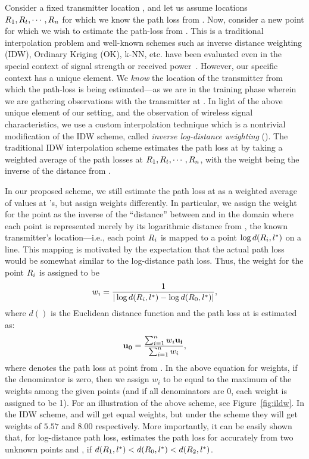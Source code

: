  Consider a fixed transmitter
location \lstar, and let us assume locations $R_1, R_t, \cdots, R_n$ for
which we know the path loss from \lstar. Now, consider a new point \lz
for which we wish to estimate the path-loss from \lstar.
This is a traditional interpolation problem and well-known schemes
such as inverse distance weighting (IDW), Ordinary Kriging (OK), k-NN,
etc. have been evaluated even in the special context of signal
strength or received power~\cite{chakraborty2017specsense}.
However, our specific context has a unique element. We
{\em know} the location \lstar of the transmitter from which the
path-loss is being estimated---as we are in the training phase wherein
we are gathering observations with the transmitter at \lstar.
In light of the above unique element of our setting, and the observation of wireless signal characteristics, we use a custom
interpolation technique which is a nontrivial modification of the IDW
scheme, called {\em inverse log-distance weighting} (\ildw). The traditional
IDW interpolation scheme estimates the
path loss at \lz by taking a weighted average of the path losses at
$R_1, R_t, \cdots, R_n$, with the weight being the inverse of the
distance from \lz. 

In our proposed \ildw scheme, we still estimate the path loss at \lz as
a weighted average of values at \li's, but assign weights differently.
In particular, we assign the weight for the point \li as the inverse
of the ``distance'' between \lz and \li in the domain where each point
is represented merely by its logarithmic distance from \lstar, the known
transmitter's location---i.e., each point $R_i$ is mapped to a point
$\log d(R_i, l^*)$ on a line. This mapping is motivated by the
expectation that the actual path loss would be somewhat similar to the
log-distance path loss.
Thus, the weight for the point $R_i$ is assigned to be
$$w_i = \frac{1}{|\log d(R_i, l^*) - \log d(R_0, l^*)|},$$ where $d()$ is the
Euclidean distance function and the path loss at \lz is estimated as:
$$\mathbf{u_0} = \frac{\sum_{i=1}^{n}w_i \mathbf{u_i}}{\sum_{i=1}^{n}w_i},$$ where \ui
denotes the path loss at point \li from \lstar. In the above equation for
weights, if the denominator is zero, then we assign $w_i$ to be equal to
the maximum of the weights among the given points (and if all
denominators are 0, each weight is assigned to be 1).
For an illustration of the above scheme, see Figure~\ref{fig:ildw}.
In the IDW scheme, \lo and \lt will get equal weights, but under the
\ildw scheme they will get weights of $5.57$ and $8.00$
respectively. More importantly, it can be easily shown that, for
log-distance path loss, \ildw estimates the path loss for \lz accurately
from two unknown points \lo and \lt, if $d(R_1, l^*) < d(R_0,
l^*) < d(R_2, l^*)$.

